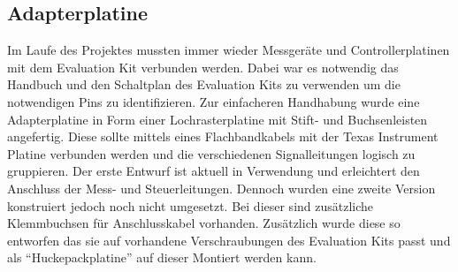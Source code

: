 \subsection{Adapterplatine}
Im Laufe des Projektes mussten immer wieder Messgeräte und Controllerplatinen mit dem Evaluation Kit verbunden werden.
Dabei war es notwendig das Handbuch und den Schaltplan des Evaluation Kits zu verwenden um die notwendigen Pins zu identifizieren.
Zur einfacheren Handhabung wurde eine Adapterplatine in Form einer Lochrasterplatine mit Stift- und Buchsenleisten angefertig.
Diese sollte mittels eines Flachbandkabels mit der Texas Instrument Platine verbunden werden und die verschiedenen Signalleitungen logisch zu gruppieren.
Der erste Entwurf ist aktuell in Verwendung und erleichtert den Anschluss der Mess- und Steuerleitungen.
Dennoch wurden eine zweite Version konstruiert jedoch noch nicht umgesetzt.
Bei dieser sind zusätzliche Klemmbuchsen für Anschlusskabel vorhanden.
Zusätzlich wurde diese so entworfen das sie auf vorhandene Verschraubungen des Evaluation Kits passt und als \enquote{Huckepackplatine} auf dieser Montiert werden kann.
